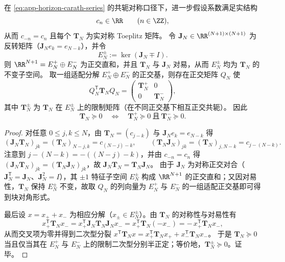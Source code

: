 \begin{proposition}\label{prop:app-horizon-toeplitz-z2-splitting}
在 \eqref{eq:app-horizon-carath-series} 的共轭对称口径下，进一步假设系数满足实结构
\[
c_n\in\RR\qquad(n\in\ZZ),
\]
从而 \(c_{-n}=c_n\) 且每个 \(\mathbf{T}_N\) 为实对称 Toeplitz 矩阵。
令 \(\mathbf{J}_N\in\RR^{(N+1)\times(N+1)}\) 为反转矩阵（\( \mathbf{J}_N e_k=e_{N-k} \)），并令
\[
E_N^{\pm}:=\ker(\mathbf{J}_N\mp I).
\]
则 \( \RR^{N+1}=E_N^{+}\oplus E_N^{-} \) 为正交直和，并且 \(\mathbf{T}_N\) 与 \(\mathbf{J}_N\) 对易，从而 \(E_N^{\pm}\) 均为 \(\mathbf{T}_N\) 的不变子空间。
取一组适配分解 \(E_N^{+}\oplus E_N^{-}\) 的正交基，则存在正交矩阵 \(Q_N\) 使
\[
Q_N^{\mathsf T}\mathbf{T}_N Q_N
=
\begin{pmatrix}
\mathbf{T}_N^{+} & 0\\
0 & \mathbf{T}_N^{-}
\end{pmatrix},
\]
其中 \(\mathbf{T}_N^{\pm}\) 为 \(\mathbf{T}_N\) 在 \(E_N^{\pm}\) 上的限制矩阵（在不同正交基下相互正交共轭）。
因此
\[
\mathbf{T}_N\succeq 0
\quad\Longleftrightarrow\quad
\mathbf{T}_N^{+}\succeq 0\ \text{且}\ \mathbf{T}_N^{-}\succeq 0.
\]
\end{proposition}

\begin{proof}
对任意 \(0\le j,k\le N\)，由 \(\mathbf{T}_N=(c_{j-k})\) 与 \(\mathbf{J}_N e_k=e_{N-k}\) 得
\[
(\mathbf{J}_N\mathbf{T}_N)_{jk}=(\mathbf{T}_N)_{N-j,k}=c_{(N-j)-k},
\qquad
(\mathbf{T}_N\mathbf{J}_N)_{jk}=(\mathbf{T}_N)_{j,N-k}=c_{j-(N-k)}.
\]
注意到 \(j-(N-k)=-( (N-j)-k)\)，并由 \(c_{-n}=c_n\) 得 \((\mathbf{J}_N\mathbf{T}_N)_{jk}=(\mathbf{T}_N\mathbf{J}_N)_{jk}\)，故 \(\mathbf{J}_N\mathbf{T}_N=\mathbf{T}_N\mathbf{J}_N\)。
由于 \(\mathbf{J}_N\) 为对称正交对合（\(\mathbf{J}_N^{\mathsf T}=\mathbf{J}_N\)、\(\mathbf{J}_N^2=I\)），其 \(\pm 1\) 特征子空间 \(E_N^{\pm}\) 构成 \(\RR^{N+1}\) 的正交直和；又因对易性，\(\mathbf{T}_N\) 保持 \(E_N^{\pm}\) 不变，故取 \(Q_N\) 的列向量为 \(E_N^{+}\) 与 \(E_N^{-}\) 的一组适配正交基即可得到块对角形式。
\par
最后设 \(x=x_{+}+x_{-}\) 为相应分解（\(x_{\pm}\in E_N^{\pm}\)）。由 \(\mathbf{T}_N\) 的对称性与对易性有
\[
x_{+}^{\mathsf T}\mathbf{T}_N x_{-}
=
x_{+}^{\mathsf T}\mathbf{J}_N\mathbf{T}_N\mathbf{J}_N x_{-}
=
x_{+}^{\mathsf T}\mathbf{T}_N(-x_{-})
=
-\,x_{+}^{\mathsf T}\mathbf{T}_N x_{-},
\]
从而交叉项为零并得到二次型分裂
\(
x^{\mathsf T}\mathbf{T}_N x=x_{+}^{\mathsf T}\mathbf{T}_N x_{+}+x_{-}^{\mathsf T}\mathbf{T}_N x_{-}
\)。
于是 \(\mathbf{T}_N\succeq 0\) 当且仅当其在 \(E_N^{+}\) 与 \(E_N^{-}\) 上的限制二次型分别半正定；等价地，\(\mathbf{T}_N^{\pm}\succeq 0\)。证毕。
\end{proof}

